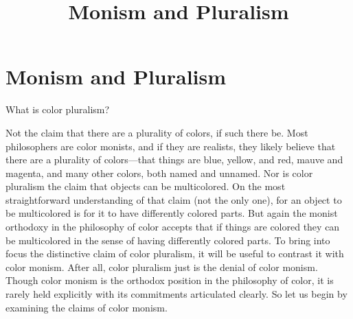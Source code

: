 \documentclass[12pt]{article}
\title{Monism and Pluralism}
\author{\myauthor}
\date{} %
\begin{document}
\maketitle

\setlength{\parindent}{1em}


\section{Monism and Pluralism} %
\label{sec:monism_and_pluralism}

What is color pluralism? 

Not the claim that there are a plurality of colors, if such there be. Most philosophers are color monists, and if they are realists, they likely believe that there are a plurality of colors---that things are blue, yellow, and red, mauve and magenta, and many other colors, both named and unnamed. Nor is color pluralism the claim that objects can be multicolored. On the most straightforward understanding of that claim (not the only one), for an object to be multicolored is for it to have differently colored parts. But again the monist orthodoxy in the philosophy of color accepts that if things are colored they can be multicolored in the sense of having differently colored parts. To bring into focus the distinctive claim of color pluralism, it will be useful to contrast it with color monism. After all, color pluralism just is the denial of color monism. Though color monism is the orthodox position in the philosophy of color, it is rarely held explicitly with its commitments articulated clearly. So let us begin by examining the claims of color monism.
\end{document}
